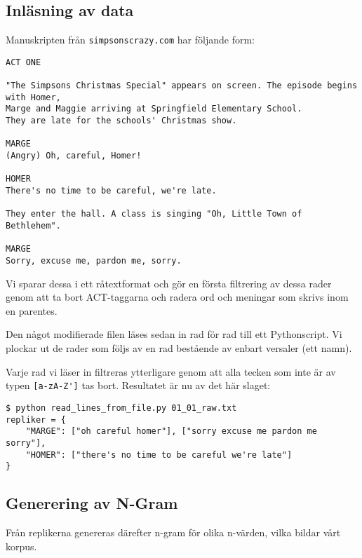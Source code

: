 \documentclass[a5paper]{article}
\begin{document}
\subsection{Inläsning av data}
Manuskripten från \nolinkurl{simpsonscrazy.com} har följande form:
\begin{verbatim}
ACT ONE

"The Simpsons Christmas Special" appears on screen. The episode begins with Homer,
Marge and Maggie arriving at Springfield Elementary School.
They are late for the schools' Christmas show.

MARGE
(Angry) Oh, careful, Homer!

HOMER
There's no time to be careful, we're late.

They enter the hall. A class is singing "Oh, Little Town of Bethlehem".

MARGE
Sorry, excuse me, pardon me, sorry.
\end{verbatim}

Vi sparar dessa i ett råtextformat och gör en första filtrering av
dessa rader genom att ta bort ACT-taggarna och radera ord och meningar
som skrivs inom en parentes.

Den något modifierade filen läses sedan in rad för rad till ett
Pythonscript. Vi plockar ut de rader som följs av en rad bestående av
enbart versaler (ett namn).

Varje rad vi läser in filtreras ytterligare genom att alla tecken som
inte är av typen \verb=[a-zA-Z']= tas bort. Resultatet är nu av det
här slaget:

\begin{verbatim}
$ python read_lines_from_file.py 01_01_raw.txt
repliker = {
    "MARGE": ["oh careful homer"], ["sorry excuse me pardon me sorry"],
    "HOMER": ["there's no time to be careful we're late"]
}
\end{verbatim}

\subsection{Generering av N-Gram}
Från replikerna genereras därefter n-gram för olika n-värden, vilka
bildar vårt korpus.

\end{document}
